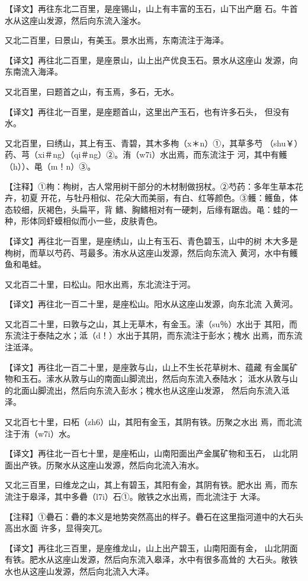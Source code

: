 \documentclass[a4paper,12pt,UTF8,twoside]{ctexbook}
\begin{document}
【译文】再往东北二百里，是座锡山，山上有丰富的玉石，山下出产磨 石。牛首水从这座山发源，然后向东流入滏水。

又北二百里，曰景山，有美玉。景水出焉，东南流注于海泽。

【译文】再往北二百里，是座景山，山上出产优良玉石。景水从这座山 发源，向东南流入海泽。

又北百里，曰题首之山，有玉焉，多石，无水。

【译文】再往北一百里，是座题首山，这里出产玉石，也有许多石头， 但没有水。

又北百里，曰绣山，其上有玉、青碧，其木多栒（x＊n）①，其草多芍 （shu￥）药、芎（xi＃ng）（qi＃ng）②。洧（w7i）水出焉，而东流注于 河，其中有鳠（h））、黾（m！n）③。

【注释】①栒：栒树，古人常用树干部分的木材制做拐杖。②芍药：多年生草本花卉，初夏 开花，与牡丹相似、花朵大而美丽，有白、红等颜色。③鳠：鳠鱼，体态较细，灰褐色，头扁平，背 鳍、胸鳍相对有一硬刺，后缘有踞齿。黾：蛙的一种，形体同虾蟆相似而小一些，皮肤青色。

【译文】再往北一百里，是座绣山，山上有玉石、青色碧玉，山中的树 木大多是栒树，而草以芍药、芎最多。洧水从这座山发源，然后向东流入 黄河，水中有鳠鱼和黾蛙。

又北百二十里，曰松山。阳水出焉，东北流注于河。

【译文】再往北一百二十里，是座松山。阳水从这座山发源，向东北流 入黄河。

又北百二十里，曰敦与之山，其上无草木，有金玉。溹（su％）水出于 其阳，而东流注于泰陆之水；泜（d！）水出于其阴，而东流注于彭水；槐水 出焉，而东流注泜泽。

【译文】再往北一百二十里，是座敦与山，山上不生长花草树木、蕴藏 有金属矿物和玉石。溹水从敦与山的南面山脚流出，然后向东流入泰陆水； 泜水从敦与山的北面山脚流出，然后向东流入彭水；槐水也从这座山发源， 然后向东流入泜泽。

又北百七十里，曰柘（zh6）山，其阳有金玉，其阴有铁。历聚之水出 焉，而北流注于洧（w7i）水。

【译文】再往北一百七十里，是座柘山，山南阳面出产金属矿物和玉石， 山北阴面出产铁。历聚水从这座山发源，然后向北流入洧水。

又北三百里，曰维龙之山，其上有碧玉，其阳有金，其阴有铁。肥水出 焉，而东流注于皋泽，其中多礨（l7i）石①。敞铁之水出焉，而北流注于 大泽。

【注释】①礨石：礨的本义是地势突然高出的样子。礨石在这里指河道中的大石头高出水面 许多，显得突兀。

【译文】再往北三百里，是座维龙山，山上出产碧玉，山南阳面有金， 山北阴面有铁。肥水从这座山发源，然后向东流入皋泽，水中有很多高耸的 大石头。敞铁水也从这座山发源，然后向北流入大泽。
\end{document}
